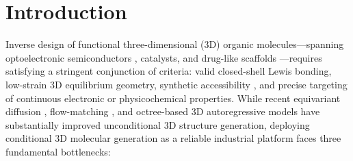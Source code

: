 \documentclass[11pt,a4paper]{article}
\begin{document}
\section{Introduction}
\label{sec:intro}

Inverse design of functional three-dimensional (3D) organic molecules---spanning optoelectronic semiconductors \citep{stuke2020oe62,bhat2023ocelot,zhao2026o2gen}, catalysts, and drug-like scaffolds \citep{hoogeboom2022edm,xu2023geoldm,zeng2026propmolflow}---requires satisfying a stringent conjunction of criteria: valid closed-shell Lewis bonding, low-strain 3D equilibrium geometry, synthetic accessibility \citep{ertl2009sa}, and precise targeting of continuous electronic or physicochemical properties. While recent equivariant diffusion \citep{hoogeboom2022edm,xu2023geoldm}, flow-matching \citep{zeng2026propmolflow}, and octree-based 3D autoregressive models \citep{lu2025uni3dar} have substantially improved unconditional 3D structure generation, deploying conditional 3D molecular generation as a reliable industrial platform faces three fundamental bottlenecks:
\end{document}
